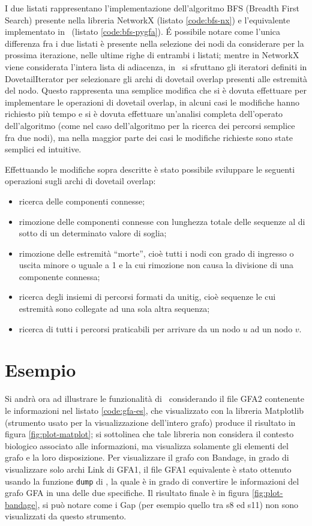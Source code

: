 I due listati rappresentano l'implementazione dell'algoritmo BFS (Breadth First Search) presente
nella libreria NetworkX (listato \ref{code:bfs-nx}) e l'equivalente implementato in \pygfa \ 
(listato \ref{code:bfs-pygfa}). \'E possibile notare come l'unica differenza fra i due listati
è presente nella selezione dei nodi da considerare per la prossima iterazione, nelle ultime
righe di entrambi i listati; mentre in NetworkX viene considerata l'intera lista di adiacenza, in
\pygfa \  si sfruttano gli iteratori definiti in DovetailIterator per selezionare gli archi di dovetail overlap
presenti alle estremità del nodo.
Questo rappresenta una semplice modifica che si è dovuta effettuare per
implementare le operazioni di dovetail overlap, in alcuni casi le modifiche
hanno richiesto più tempo e si è dovuta effettuare un'analisi
completa dell'operato dell'algoritmo (come nel
caso dell'algoritmo per la ricerca dei percorsi semplice fra due nodi),
ma nella maggior parte dei casi le modifiche richieste sono state semplici
ed intuitive.

Effettuando le modifiche sopra descritte è stato possibile sviluppare
le seguenti operazioni sugli archi di dovetail overlap:
\begin{itemize}
	\item ricerca delle componenti connesse;
	\item rimozione delle componenti connesse con lunghezza
		totale delle sequenze al di sotto di un determinato valore di soglia;
	\item rimozione delle estremità ``morte'', cioè tutti i nodi con
		grado di ingresso o uscita minore o uguale a 1 e la cui rimozione non causa
		la divisione di una componente connessa;
	\item ricerca degli insiemi di percorsi formati da unitig, cioè sequenze
		le cui estremità sono collegate ad una sola altra sequenza;
	\item ricerca di tutti i percorsi praticabili per arrivare da un nodo $u$ ad
		un nodo $v$.
\end{itemize}

\newpage
\section{Esempio}
Si andrà ora ad illustrare le funzionalità di \pygfa \  considerando il file GFA2
contenente le informazioni nel listato \ref{code:gfa-es}, che visualizzato
con la libreria Matplotlib (strumento usato per la visualizzazione dell'intero grafo)
produce il risultato in figura \ref{fig:plot-matplot}; si sottolinea che tale libreria
non considera il contesto biologico associato alle informazioni, ma visualizza
solamente gli elementi del grafo e la loro disposizione.
Per visualizzare il grafo con Bandage, in grado di visualizzare solo archi Link di GFA1,
il file GFA1 equivalente è stato ottenuto usando la funzione \texttt{dump}
di \pygfa, la quale è in grado di convertire le informazioni del grafo GFA
in una delle due specifiche.
Il risultato finale è in figura \ref{fig:plot-bandage}, si
può notare come i Gap (per esempio quello tra s8 ed s11)
non sono visualizzati da questo strumento.

